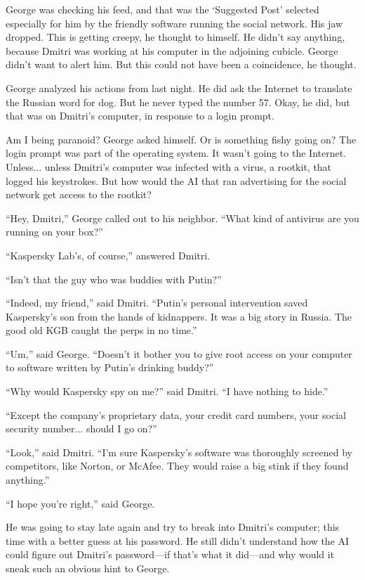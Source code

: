 \documentclass{memoir}
\begin{document}
George was checking his feed, and that was the `Suggested Post' selected especially for him by the friendly software running the social network. His jaw dropped. This is getting creepy, he thought to himself. He didn't say anything, because Dmitri was working at his computer in the adjoining cubicle. George didn't want to alert him. But this could not have been a coincidence, he thought. 

George analyzed his actions from last night. He did ask the Internet to translate the Russian word for dog. But he never typed the number 57. Okay, he did, but that was on Dmitri's computer, in response to a login prompt. 

Am I being paranoid? George asked himself. Or is something fishy going on? The login prompt was part of the operating system. It wasn't going to the Internet. Unless... unless Dmitri's computer was infected with a virus, a rootkit, that logged his keystrokes. But how would the AI that ran advertising for the social network get access to the rootkit? 

``Hey, Dmitri,'' George called out to his neighbor. ``What kind of antivirus are you running on your box?''

``Kaspersky Lab's, of course,'' answered Dmitri. 

``Isn't that the guy who was buddies with Putin?''

``Indeed, my friend,'' said Dmitri. ``Putin's personal intervention saved Kaspersky's son from the hands of kidnappers. It was a big story in Russia. The good old KGB caught the perps in no time.''

``Um,'' said George. ``Doesn't it bother you to give root access on your computer to software written by Putin's drinking buddy?''

``Why would Kaspersky spy on me?'' said Dmitri. ``I have nothing to hide.''

``Except the company's proprietary data, your credit card numbers, your social security number... should I go on?''

``Look,'' said Dmitri. ``I'm sure Kaspersky's software was thoroughly screened by competitors, like Norton, or McAfee. They would raise a big stink if they found anything.''

``I hope you're right,'' said George. 

He was going to stay late again and try to break into Dmitri's computer; this time with a better guess at his password. He still didn't understand how the AI could figure out Dmitri's password---if that's what it did---and why would it sneak such an obvious hint to George.
\end{document}
